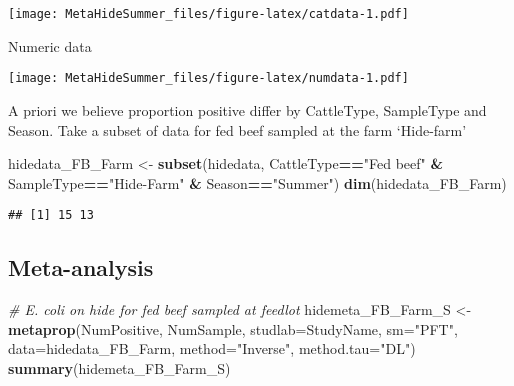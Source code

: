 \documentclass[]{article}
\newenvironment{Shaded}{\begin{snugshade}}{\end{snugshade}}
\newcommand{\KeywordTok}[1]{\textcolor[rgb]{0.13,0.29,0.53}{\textbf{#1}}}
\newcommand{\DataTypeTok}[1]{\textcolor[rgb]{0.13,0.29,0.53}{#1}}
\newcommand{\DecValTok}[1]{\textcolor[rgb]{0.00,0.00,0.81}{#1}}
\newcommand{\StringTok}[1]{\textcolor[rgb]{0.31,0.60,0.02}{#1}}
\newcommand{\CommentTok}[1]{\textcolor[rgb]{0.56,0.35,0.01}{\textit{#1}}}
\newcommand{\OperatorTok}[1]{\textcolor[rgb]{0.81,0.36,0.00}{\textbf{#1}}}
\newcommand{\NormalTok}[1]{#1}
\begin{document}
\texttt{[image: MetaHideSummer\_files/figure-latex/catdata-1.pdf]}

Numeric data

\begin{Shaded}
\end{Shaded}

\texttt{[image: MetaHideSummer\_files/figure-latex/numdata-1.pdf]}

A priori we believe proportion positive differ by CattleType, SampleType
and Season. Take a subset of data for fed beef sampled at the farm
`Hide-farm'

\begin{Shaded}
\begin{Highlighting}[]
\NormalTok{hidedata_FB_Farm <-}\StringTok{ }\KeywordTok{subset}\NormalTok{(hidedata, CattleType}\OperatorTok{==}\StringTok{"Fed beef"} \OperatorTok{&}\StringTok{ }\NormalTok{SampleType}\OperatorTok{==}\StringTok{"Hide-Farm"} \OperatorTok{&}\StringTok{ }\NormalTok{Season}\OperatorTok{==}\StringTok{"Summer"}\NormalTok{)}
\KeywordTok{dim}\NormalTok{(hidedata_FB_Farm)}
\end{Highlighting}
\end{Shaded}

\begin{verbatim}
## [1] 15 13
\end{verbatim}

\subsection{Meta-analysis}\label{meta-analysis}

\begin{Shaded}
\begin{Highlighting}[]
\CommentTok{# E. coli on hide for fed beef sampled at feedlot }
\NormalTok{hidemeta_FB_Farm_S <-}\StringTok{ }\KeywordTok{metaprop}\NormalTok{(NumPositive, NumSample, }\DataTypeTok{studlab=}\NormalTok{StudyName, }\DataTypeTok{sm=}\StringTok{"PFT"}\NormalTok{, }\DataTypeTok{data=}\NormalTok{hidedata_FB_Farm, }\DataTypeTok{method=}\StringTok{"Inverse"}\NormalTok{, }\DataTypeTok{method.tau=}\StringTok{"DL"}\NormalTok{)}
\KeywordTok{summary}\NormalTok{(hidemeta_FB_Farm_S)}
\end{Highlighting}
\end{Shaded}
\end{document}
